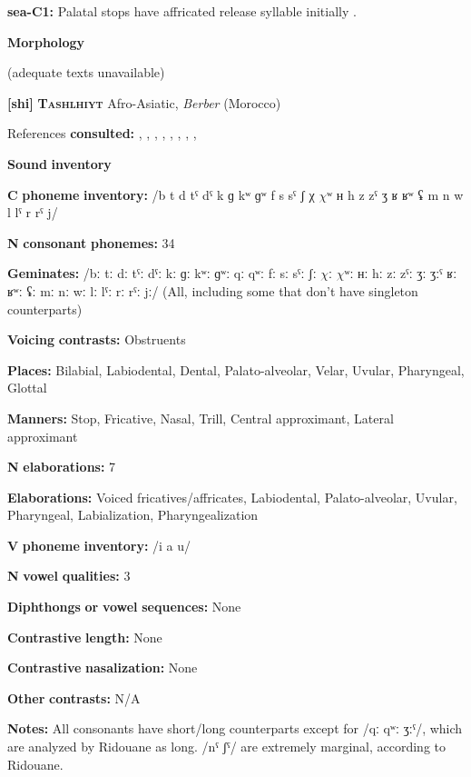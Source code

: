 \textbf{sea-C1:} Palatal stops have affricated release syllable initially \citep[5]{Philips2007}.

\textbf{Morphology}

(adequate texts unavailable)

\textbf{[shi]}   \textbf{\textsc{Tashlhiyt}}  Afro-Asiatic, \textit{Berber} (Morocco)

References \textbf{consulted:} \citet{Coleman2001}, \citet{DellElmedlaoui2002}, \citet{GordonNafi2012}, \citet{PuechLouali1999}, \citet{Ridouane2002}, \citet{Ridouane2007}, \citet{Ridouane2008}, \citet{Ridouane2014}, \citet{RoettgerEtAl2015}

\textbf{Sound} \textbf{inventory}

\textbf{C} \textbf{phoneme} \textbf{inventory:} /b t d tˤ dˤ k ɡ kʷ ɡʷ f s sˤ ʃ χ $\chi ʷ$ ʜ h z zˤ ʒ ʁ ʁʷ ʢ m n w l lˤ r rˤ j/

\textbf{N} \textbf{consonant} \textbf{phonemes:} 34

\textbf{Geminates:} /bː tː dː tˤː dˤː kː ɡː kʷː ɡʷː qː qʷː fː sː sˤː ʃː $\chi ː$ $\chi ʷː$ ʜː hː zː zˤː ʒː ʒːˤ ʁː ʁʷː ʢː mː nː wː lː lˤː rː rˤː jː/ (All, including some that don’t have singleton counterparts)

\textbf{Voicing} \textbf{contrasts:} Obstruents

\textbf{Places:} Bilabial, Labiodental, Dental, Palato-alveolar, Velar, Uvular, Pharyngeal, Glottal

\textbf{Manners:} Stop, Fricative, Nasal, Trill, Central approximant, Lateral approximant

\textbf{N} \textbf{elaborations:} 7

\textbf{Elaborations:} Voiced fricatives/affricates, Labiodental, Palato-alveolar, Uvular, Pharyngeal, Labialization, Pharyngealization

\textbf{V} \textbf{phoneme} \textbf{inventory:} /i a u/

\textbf{N} \textbf{vowel} \textbf{qualities:} 3

\textbf{Diphthongs} \textbf{or} \textbf{vowel} \textbf{sequences:} None

\textbf{Contrastive} \textbf{length:} None

\textbf{Contrastive} \textbf{nasalization:} None

\textbf{Other} \textbf{contrasts:} N/A

\textbf{Notes:} All consonants have short/long counterparts except for /qː qʷː ʒːˤ/, which are analyzed by Ridouane as long. /nˤ ʃˤ/ are extremely marginal, according to Ridouane.

